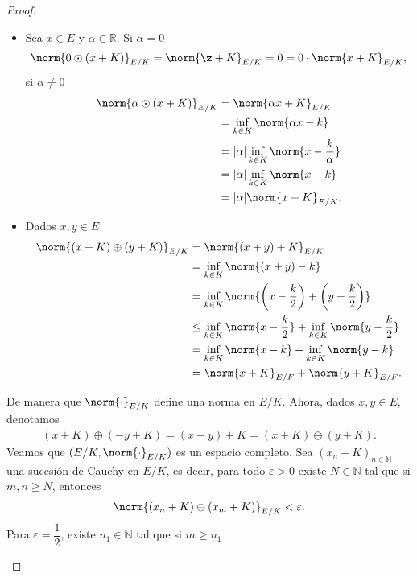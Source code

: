 \begin{proof}
\begin{enumerate}
\begin{enumerate}
\begin{itemize}
            \item Sea $x \in E$ y $\alpha \in \mathbb{R}$. Si $\alpha=0$
            \begin{align*}
                \norm{0\odot (x+K)}_{E/K}=\norm{\z+K}_{E/K}=0=0\cdot\norm{x+K}_{E/K},
            \end{align*}
            si $\alpha\neq 0$
            \begin{align*}
                \norm{\alpha\odot(x+K)}_{E/K}&=\norm{\alpha x+K}_{E/K}\\
                &=\inf_{k \in K}\norm{\alpha x-k}\\
                &=|\alpha|\inf_{k \in K}\norm{x-\frac{k}{\alpha}}\\
                &=|\alpha|\inf_{k \in K}\norm{x-k}\\
                &=|\alpha|\norm{x+K}_{E/K}.
            \end{align*}
            \item Dados $x,y \in E$
            \begin{align*}
                \norm{(x+K)\oplus(y+K)}_{E/K}&=\norm{(x+y)+K}_{E/K}\\
                &=\inf_{k\in K}\norm{(x+y)-k}\\
                &=\inf_{k \in K}\norm{\left(x-\frac{k}{2}\right)+\left(y-\dfrac{k}{2}\right)}\\
                &\leq \inf_{k \in K}\norm{x-\frac{k}{2}}+\inf_{k \in K}\norm{y-\frac{k}{2}}\\
                &=\inf_{k \in K}\norm{x-k}+\inf_{k \in K}\norm{y-k}\\
                &=\norm{x+K}_{E/F}+\norm{y+K}_{E/F}.
            \end{align*}
        \end{itemize}
        De manera que $\norm{\cdot}_{E/K}$ define una norma en $E/K$. Ahora, dados $x,y \in E$, denotamos 
        \begin{align*}
            (x+K)\oplus(-y+K)=(x-y)+K=(x+K)\ominus (y+K).
        \end{align*}
        Veamos que $(E/K,\norm{\cdot}_{E/K})$ es un espacio completo. Sea $(x_n+K)_{n \in \mathbb{N}}$ una sucesión de Cauchy en $E/K$, es decir, para todo $\varepsilon>0$ existe $N\in \mathbb{N}$ tal que si $m,n\geq N$, entonces
        \begin{align*}
            \norm{(x_n+K)\ominus(x_m+K)}_{E/K}<\varepsilon.
        \end{align*}
        Para $\varepsilon=\dfrac{1}{2}$, existe $n_1\in \mathbb{N}$ tal que si $m\geq n_1$

\end{enumerate}
\end{enumerate}
\end{proof}
